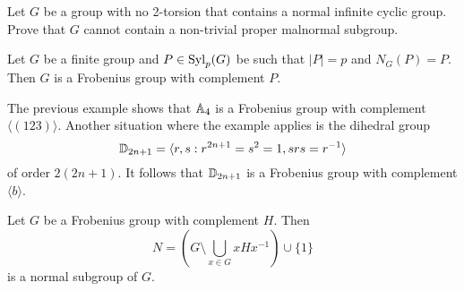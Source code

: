 \begin{bonus}
\label{xca:malnormal_no2torsion}
    Let $G$ be a group with no 2-torsion 
    that contains a normal infinite cyclic group. Prove 
    that $G$ cannot contain a non-trivial proper malnormal subgroup. 
\end{bonus}


\begin{example}
    Let $G$ be a finite group 
    and $P\in\mathrm{Syl}_p(G)$ be such that $|P|=p$ and $N_G(P)=P$. Then $G$ is a Frobenius group
    with complement $P$. 
\end{example}

The previous example shows that 
$\mathbb{A}_4$ is a Frobenius group
with complement $\langle(123)\rangle$. Another situation
where the example applies is the dihedral
group 
\[
\mathbb{D}_{2n+1}=\langle r,s:r^{2n+1}=s^2=1,srs=r^{-1}\rangle
\]
of order $2(2n+1)$. It follows that
$\mathbb{D}_{2n+1}$ is a Frobenius
group with complement $\langle b\rangle$. 

\begin{theorem}[Frobenius]
  \label{thm:Frobenius}
  Let $G$ be a Frobenius group with complement $H$. Then
  \[
	N=\left( G\setminus\bigcup_{x\in G}xHx^{-1}\right)\cup\{1\}
  \]
  is a normal subgroup of $G$.
\end{theorem}


